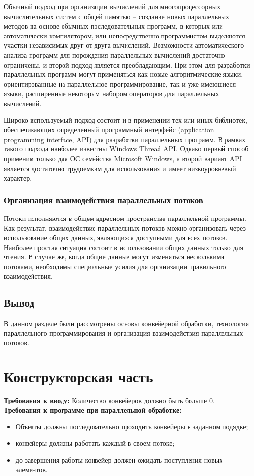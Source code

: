 \documentclass[12pt]{report}
\begin{document}
Обычный подход при организации вычислений для многопроцессорных вычислительных систем с общей памятью – создание новых параллельных методов на основе обычных последовательных программ, в которых или автоматически компилятором, или непосредственно программистом выделяются участки независимых друг от друга вычислений. Возможности автоматического анализа программ для порождения параллельных вычислений достаточно ограничены, и второй подход является преобладающим. При этом для разработки параллельных программ могут применяться как новые алгоритмические языки, ориентированные на параллельное программирование, так и уже имеющиеся языки, расширенные некоторым набором операторов для параллельных вычислений.

Широко используемый подход состоит и в применении тех или иных библиотек, обеспечивающих определенный программный интерфейс (application programming interface, API) для разработки параллельных программ. В рамках такого подхода наиболее известны Windows Thread API. Однако первый способ применим только для ОС семейства Microsoft Windows, а второй вариант API является достаточно трудоемким для использования и имеет низкоуровневый характер.\cite{Barkalov}

\subsection{Организация взаимодействия параллельных потоков}
	Потоки исполняются в общем адресном пространстве параллельной программы. Как результат, взаимодействие параллельных потоков можно организовать через использование общих данных, являющихся доступными для всех потоков. Наиболее простая ситуация состоит в использовании общих данных только для чтения. В случае же, когда общие данные могут изменяться несколькими потоками, необходимы специальные усилия для организации правильного взаимодействия.

\section{Вывод}
В данном разделе были рассмотрены основы конвейерной обработки, технология параллельного программирования и
организация взаимодействия параллельных потоков.



\chapter{Конструкторская часть}
\textbf{Требования к вводу:}
Количество конвейеров должно быть больше 0.
\newline
\textbf{Требования к программе при параллельной обработке:}
\begin{itemize}
\item Объекты должны последовательно проходить конвейеры в заданном подядке;
\item конвейеры должны работать каждый в своем потоке;
\item до завершения работы конвейер должен ожидать поступления новых элементов.
\end{itemize}
\end{document}
